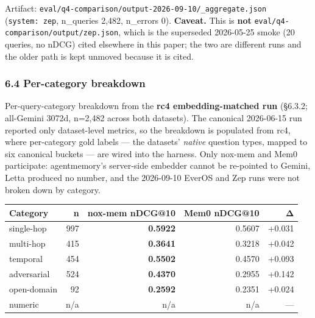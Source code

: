 \documentclass[
]{article}
\newcounter{none} %
\begin{document}
Artifact: \texttt{eval/q4-comparison/output-2026-09-10/\_aggregate.json}
(\texttt{system:\ zep}, n\_queries 2,482, n\_errors 0). \textbf{Caveat.}
This is \textbf{not} \texttt{eval/q4-comparison/output/zep.json}, which
is the superseded 2026-05-25 smoke (20 queries, no nDCG) cited elsewhere
in this paper; the two are different runs and the older path is kept
unmoved because it is cited.

\subsubsection{6.4 Per-category breakdown}\label{per-category-breakdown}

Per-query-category breakdown from the \textbf{rc4 embedding-matched run}
(§6.3.2; all-Gemini 3072d, n=2,482 across both datasets). The canonical
2026-06-15 run reported only dataset-level metrics, so the breakdown is
populated from rc4, where per-category gold labels --- the datasets'
\emph{native} question types, mapped to six canonical buckets --- are
wired into the harness. Only nox-mem and Mem0 participate: agentmemory's
server-side embedder cannot be re-pointed to Gemini, Letta produced no
number, and the 2026-09-10 EverOS and Zep runs were not broken down by
category.

{\def\LTcaptype{none} %
\begin{longtable}[]{@{}lrrrr@{}}
\toprule\noalign{}
Category & n & nox-mem nDCG@10 & Mem0 nDCG@10 & Δ \\
\midrule\noalign{}
\endhead
\bottomrule\noalign{}
\endlastfoot
single-hop & 997 & \textbf{0.5922} & 0.5607 & +0.031 \\
multi-hop & 415 & \textbf{0.3641} & 0.3218 & +0.042 \\
temporal & 454 & \textbf{0.5502} & 0.4570 & +0.093 \\
adversarial & 524 & \textbf{0.4370} & 0.2955 & +0.142 \\
open-domain & 92 & \textbf{0.2592} & 0.2351 & +0.024 \\
numeric & n/a & n/a & n/a & --- \\
\end{longtable}
}
\end{document}
